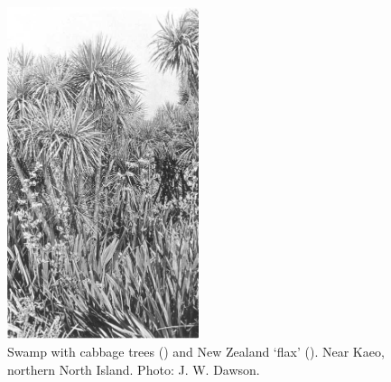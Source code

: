 \begin{figure}
	\includegraphics[width=0.5\textwidth]{graphics/figure66cabbagetree.jpg}
	\centering
	\caption[Swamp with cabbage trees]{Swamp with cabbage trees () and New Zealand `flax' (). Near Kaeo, northern North Island.
	Photo: J. W. Dawson.}
	\label{fig:66cabbagetree}
\end{figure}

